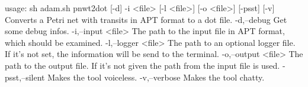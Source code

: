 usage: sh adam.sh pnwt2dot [-d] -i <file> [-l <file>] [-o <file>] [-psst] [-v]
Converts a Petri net with transits in APT format to a dot file.
 -d,--debug           Get some debug infos.
 -i,--input <file>    The path to the input file in APT format, which should be examined.
 -l,--logger <file>   The path to an optional logger file. If it's not set, the information
                      will be send to the terminal.
 -o,--output <file>   The path to the output file. If it's not given the path from the input
                      file is used.
 -psst,--silent       Makes the tool voiceless.
 -v,--verbose         Makes the tool chatty.

